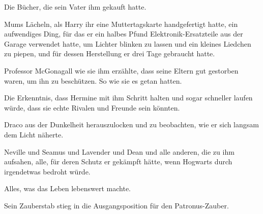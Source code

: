 Die Bücher, die sein Vater ihm gekauft hatte.

Mums Lächeln, als Harry ihr eine Muttertagskarte handgefertigt hatte, ein aufwendiges Ding, für das er ein halbes Pfund Elektronik-Ersatzteile aus der Garage verwendet hatte, um Lichter blinken zu lassen und ein kleines Liedchen zu piepen, und für dessen Herstellung er drei Tage gebraucht hatte.

Professor McGonagall wie sie ihm erzählte, dass seine Eltern gut gestorben waren, um ihn zu beschützen. So wie sie es getan hatten.

Die Erkenntnis, dass Hermine mit ihm Schritt halten und sogar schneller laufen würde, dass sie echte Rivalen und Freunde sein könnten.

Draco aus der Dunkelheit herauszulocken und zu beobachten, wie er sich langsam dem Licht näherte.

Neville und Seamus und Lavender und Dean und alle anderen, die zu ihm aufsahen, alle, für deren Schutz er gekämpft hätte, wenn Hogwarts durch irgendetwas bedroht würde.

Alles, was das Leben lebenswert machte.

Sein Zauberstab stieg in die Ausgangsposition für den Patronus-Zauber.

